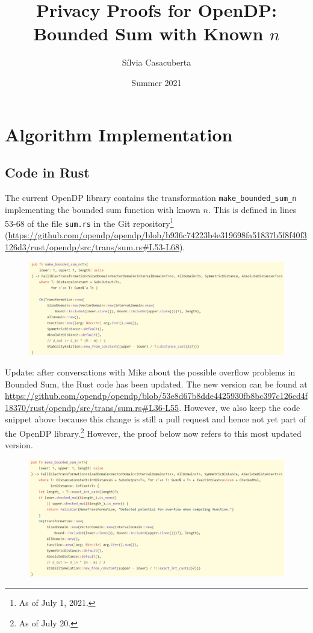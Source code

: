 \documentclass[11pt,a4paper]{article}
\title{Privacy Proofs for OpenDP: Bounded Sum with Known $n$}
\author{S\'ilvia Casacuberta}
\date{Summer 2021}
\theoremstyle{definition}
\begin{document}
\maketitle

\tableofcontents

\section{Algorithm Implementation}
\subsection{Code in Rust}
The current OpenDP library contains the transformation \texttt{make\_bounded\_sum\_n} implementing the bounded sum function with known $n$. This is defined in lines 53-68 of the file \texttt{sum.rs} in the Git repository\footnote{As of July 1, 2021.} (\url{https://github.com/opendp/opendp/blob/b936c74223b4e319698fa51837b5f8f40f3126d3/rust/opendp/src/trans/sum.rs#L53-L68}).

\begin{figure}[ht]
    \includegraphics[width=15cm]{sumn.png}
    \centering
    \label{fig:code}
\end{figure}

\newpage

Update: after conversations with Mike about the possible overflow problems in Bounded Sum, the Rust code has been updated. The new version can be found at \url{https://github.com/opendp/opendp/blob/53e8d67b8dde4425930fb8bc397c126cd4f18370/rust/opendp/src/trans/sum.rs#L36-L55}. However, we also keep the code snippet above because this change is still a pull request and hence not yet part of the OpenDP library.\footnote{As of July 20.} However, the proof below now refers to this most updated version.

\begin{figure}[ht]
    \includegraphics[width=15cm]{bounded_sum_2.png}
    \centering
    \label{fig:code}
\end{figure}
\end{document}
